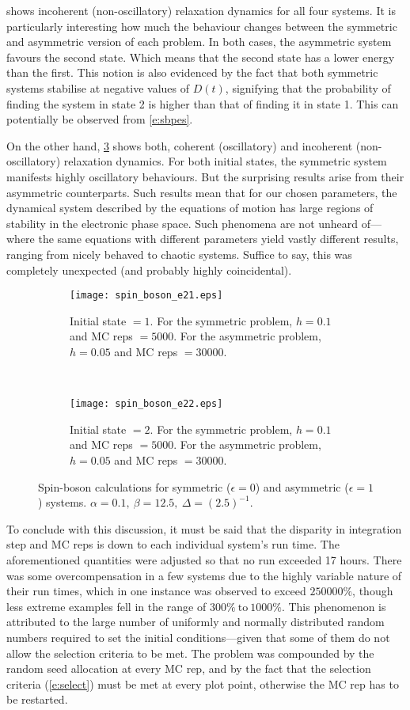  shows incoherent (non-oscillatory) relaxation dynamics for all four systems. It is particularly interesting how much the behaviour changes between the symmetric and asymmetric version of each problem. In both cases, the asymmetric system favours the second state. Which means that the second state has a lower energy than the first. This notion is also evidenced by the fact that both symmetric systems stabilise at negative values of $ D(t) $, signifying that the probability of finding the system in state 2 is higher than that of finding it in state 1. This can potentially be observed from \cref{e:sbpes}.

On the other hand, \cref{sumf:sb2} shows both, coherent (oscillatory) and incoherent (non-oscillatory) relaxation dynamics. For both initial states, the symmetric system manifests highly oscillatory behaviours. But the surprising results arise from their asymmetric counterparts. Such results mean that for our chosen parameters, the dynamical system described by the equations of motion has large regions of stability in the electronic phase space. Such phenomena are not unheard of---where the same equations with different parameters yield vastly different results, ranging from nicely behaved to chaotic systems. Suffice to say, this was completely unexpected (and probably highly coincidental).

\begin{figure}
\begin{subfigure}[t]{0.5\textwidth}
\centering
\texttt{[image: spin\_boson\_e21.eps]}
\caption[]{Initial state $ =1 $. For the symmetric problem, $ h = 0.1 $ and MC reps $ = 5000 $. For the asymmetric problem, $ h = 0.05 $ and MC reps $ = 30000 $.}
\label{sumf:sbe21}
\end{subfigure}
~
\begin{subfigure}[t]{0.5\textwidth}
\centering
\texttt{[image: spin\_boson\_e22.eps]}
\caption[]{Initial state $ = 2 $. For the symmetric problem, $ h = 0.1 $ and MC reps $ = 5000 $. For the asymmetric problem, $ h = 0.05 $ and MC reps $ = 30000 $.}
\label{sumf:sbe22}
\end{subfigure}
\caption[]{Spin-boson calculations for symmetric ($ \epsilon = 0 $) and asymmetric ($ \epsilon = 1 $) systems. $\alpha = 0.1,~\beta = 12.5,~\Delta = (2.5)^{-1}$.}\label{sumf:sb2}
\end{figure}

To conclude with this discussion, it must be said that the disparity in integration step and MC reps is down to each individual system's run time. The aforementioned quantities were adjusted so that no run exceeded 17 hours. There was some overcompensation in a few systems due to the highly variable nature of their run times, which in one instance was observed to exceed $ 250000\% $, though less extreme examples fell in the range of $ 300\%~\text{to}~1000\% $. This phenomenon is attributed to the large number of uniformly and normally distributed random numbers required to set the initial conditions---given that some of them do not allow the selection criteria to be met. The problem was compounded by the random seed allocation at every MC rep, and by the fact that the selection criteria (\cref{e:select}) must be met at every plot point, otherwise the MC rep has to be restarted.
%
